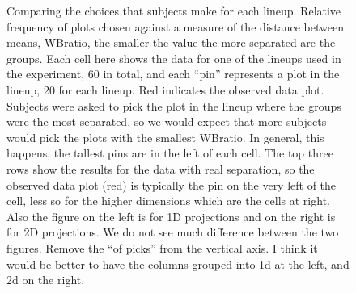 \documentclass[12]{article}
\newcommand{\blue}{\color{blue}}
\begin{document}
\begin{figure}[hbtp]
       \caption{Comparing the choices that subjects make for each lineup. Relative frequency of plots chosen against a measure of the distance between means, WBratio, the smaller the value the more separated are the groups. Each cell here shows the data for one of the lineups used in the experiment, 60 in total, and each ``pin'' represents a plot in the lineup, 20 for each lineup. Red indicates the observed data plot. Subjects were asked to pick the plot in the lineup where the groups were the most separated, so we would expect that more subjects would pick the plots with the smallest WBratio. In general, this happens, the tallest pins are in the left of each cell. The top three rows show the results for the data with real separation, so the observed data plot (red) is typically the pin on the very left of the cell, less so for the higher dimensions which are the cells at right. Also the figure on the left is for 1D projections and on the right is for 2D projections. We do not see much difference between the two figures. {\blue Remove the ``of picks'' from the vertical axis. I think it would be better to have the columns grouped into 1d at the left, and 2d on the right.}}
       \label{wbratio}
\end{figure}

\end{document}
